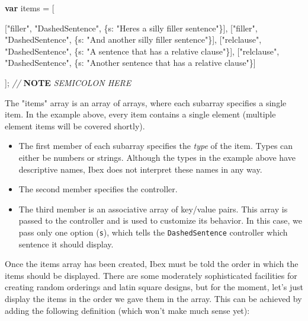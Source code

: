 \documentclass[
]{article}
\newenvironment{Shaded}{}{}
\newcommand{\AlertTok}[1]{\textcolor[rgb]{1.00,0.00,0.00}{\textbf{#1}}}
\newcommand{\CommentTok}[1]{\textcolor[rgb]{0.38,0.63,0.69}{\textit{#1}}}
\newcommand{\DataTypeTok}[1]{\textcolor[rgb]{0.56,0.13,0.00}{#1}}
\newcommand{\KeywordTok}[1]{\textcolor[rgb]{0.00,0.44,0.13}{\textbf{#1}}}
\newcommand{\NormalTok}[1]{#1}
\newcommand{\OperatorTok}[1]{\textcolor[rgb]{0.40,0.40,0.40}{#1}}
\newcommand{\StringTok}[1]{\textcolor[rgb]{0.25,0.44,0.63}{#1}}
\begin{document}
\begin{Shaded}
\begin{Highlighting}[]
    \KeywordTok{var}\NormalTok{ items }\OperatorTok{=}\NormalTok{ [}

\NormalTok{    [}\StringTok{"filler"}\OperatorTok{,} \StringTok{"DashedSentence"}\OperatorTok{,}\NormalTok{ \{}\DataTypeTok{s}\OperatorTok{:} \StringTok{"Here\textquotesingle{}s a silly filler sentence"}\NormalTok{\}]}\OperatorTok{,}
\NormalTok{    [}\StringTok{"filler"}\OperatorTok{,} \StringTok{"DashedSentence"}\OperatorTok{,}\NormalTok{ \{}\DataTypeTok{s}\OperatorTok{:} \StringTok{"And another silly filler sentence"}\NormalTok{\}]}\OperatorTok{,}
\NormalTok{    [}\StringTok{"relclause"}\OperatorTok{,} \StringTok{"DashedSentence"}\OperatorTok{,}\NormalTok{ \{}\DataTypeTok{s}\OperatorTok{:} \StringTok{"A sentence that has a relative clause"}\NormalTok{\}]}\OperatorTok{,}
\NormalTok{    [}\StringTok{"relclause"}\OperatorTok{,} \StringTok{"DashedSentence"}\OperatorTok{,}\NormalTok{ \{}\DataTypeTok{s}\OperatorTok{:} \StringTok{"Another sentence that has a relative clause"}\NormalTok{\}]}

\NormalTok{    ]}\OperatorTok{;} \CommentTok{// }\AlertTok{NOTE}\CommentTok{ SEMICOLON HERE}
\end{Highlighting}
\end{Shaded}

The "items" array is an array of arrays, where each subarray specifies a
single item. In the example above, every item contains a single element
(multiple element items will be covered shortly).

\begin{itemize}
\item
  The first member of each subarray specifies the \emph{type} of the
  item. Types can either be numbers or strings. Although the types in
  the example above have descriptive names, Ibex does not interpret
  these names in any way.
\item
  The second member specifies the controller.
\item
  The third member is an associative array of key/value pairs. This
  array is passed to the controller and is used to customize its
  behavior. In this case, we pass only one option (\texttt{s}), which
  tells the \texttt{DashedSentence} controller which sentence it should
  display.
\end{itemize}

Once the items array has been created, Ibex must be told the order in
which the items should be displayed. There are some moderately
sophisticated facilities for creating random orderings and latin square
designs, but for the moment, let's just display the items in the order
we gave them in the array. This can be achieved by adding the following
definition (which won't make much sense yet):
\end{document}
